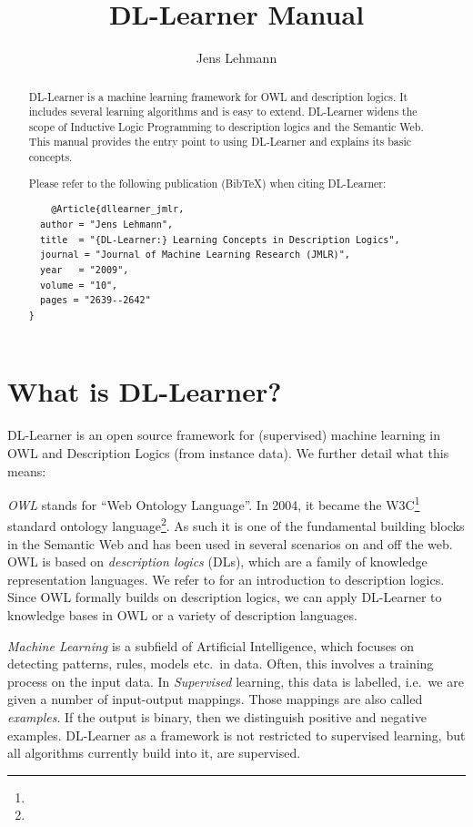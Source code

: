 \documentclass[a4paper,12pt]{scrartcl}
\title{DL-Learner Manual}
\author{Jens Lehmann}
\begin{document}
\maketitle

\begin{abstract}
\vspace{-15pt}
DL-Learner is a machine learning framework for OWL and description logics. It includes several learning algorithms and is easy to extend. DL-Learner widens the scope of Inductive Logic Programming to description logics and the Semantic Web. This manual provides the entry point to using DL-Learner and explains its basic concepts.

Please refer to the following publication (BibTeX) when citing DL-Learner:
\begin{verbatim}
	@Article{dllearner_jmlr,
  author = "Jens Lehmann",
  title  = "{DL-Learner:} Learning Concepts in Description Logics",
  journal = "Journal of Machine Learning Research (JMLR)",
  year   = "2009",
  volume = "10",
  pages = "2639--2642"
}
\end{verbatim}
\end{abstract}

\vspace{-25pt}
\tableofcontents

\clearpage

\section{What is DL-Learner?}
\label{sec:whatis}

DL-Learner is an open source framework for (supervised) machine learning in OWL and Description Logics (from instance data). We further detail what this means:

\emph{OWL} stands for ``Web Ontology Language''. In 2004, it became the W3C\footnote{\wwwc} standard ontology language\footnote{\owl}. As such it is one of the fundamental building blocks in the Semantic Web and has been used in several scenarios on and off the web. OWL is based on \emph{description logics} (DLs), which are a family of knowledge representation languages. We refer to \cite{dlhb} for an introduction to description logics. Since OWL formally builds on description logics, we can apply DL-Learner to knowledge bases in OWL or a variety of description languages.

\emph{Machine Learning} is a subfield of Artificial Intelligence, which focuses on detecting patterns, rules, models etc.~in data. Often, this involves a training process on the input data. In \emph{Supervised} learning, this data is labelled, i.e.~we are given a number of input-output mappings. Those mappings are also called \emph{examples}. If the output is binary, then we distinguish positive and negative examples. DL-Learner as a framework is not restricted to supervised learning, but all algorithms currently build into it, are supervised.
\end{document}

